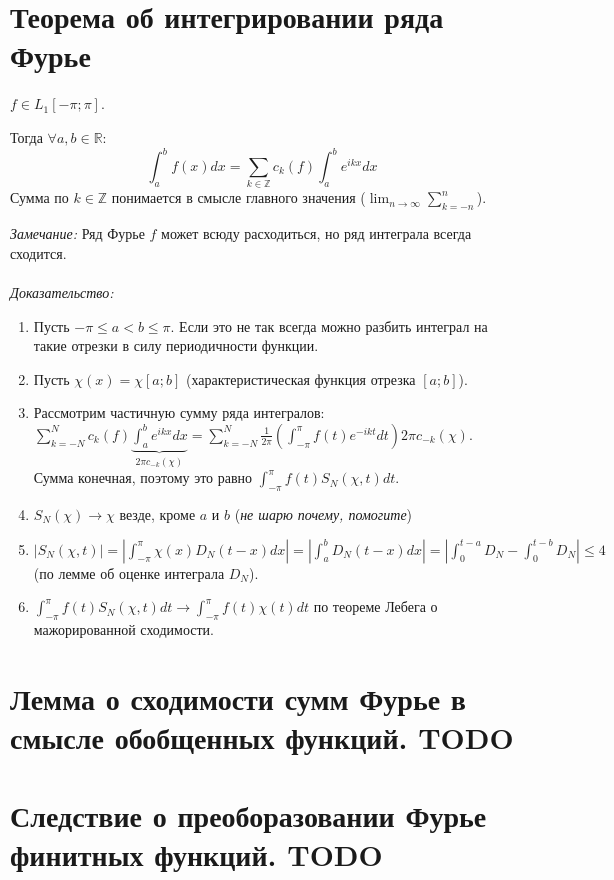 \documentclass[paper=a4, fontsize=17pt]{article}
\begin{document}
\section{Теорема об интегрировании ряда Фурье}
$f \in L_1[-\pi;\pi]$.

Тогда $\forall a, b \in \mathbb{R}$:
$$\int_a^b f(x)dx = \sum_{k\in\mathbb{Z}} c_k(f) \int_a^b e^{ikx} dx$$
Сумма по $k \in \mathbb{Z}$ понимается в смысле главного значения ($\lim_{n \to \infty} \sum_{k=-n}^n$).

\emph{Замечание:} Ряд Фурье $f$ может всюду расходиться, но ряд интеграла всегда сходится.
\\\\
\emph{Доказательство:}

\begin{enumerate}
    \item Пусть $-\pi \leq a < b \leq \pi$. Если это не так всегда можно разбить интеграл на такие отрезки в силу периодичности функции.
    \item Пусть $\chi(x) = \chi[a;b]$ (характеристическая функция отрезка $[a;b]$).
    \item Рассмотрим частичную сумму ряда интегралов:\\
        $\sum_{k=-N}^N c_k(f) \underbrace{\int_a^b e^{ikx} dx}_{2\pi c_{-k}(\chi)} =
        \sum_{k=-N}^N \frac{1}{2\pi} (\int_{-\pi}^\pi f(t) e^{-ikt} dt) 2\pi c_{-k}(\chi)$.\\
        Сумма конечная, поэтому это равно $\int_{-\pi}^{\pi} f(t) S_N(\chi,t) dt$.
    \item $S_N(\chi) \to \chi$ везде, кроме $a$ и $b$ (\emph{не шарю почему, помогите})
    \item $|S_N(\chi,t)| = |\int_{-\pi}^\pi \chi(x)D_N(t-x)dx| = |\int_a^b D_N(t-x)dx| =
        |\int_0^{t-a}D_N - \int_0^{t-b}D_N| \leq 4$ (по лемме об оценке интеграла $D_N$).
    \item $\int_{-\pi}^\pi f(t)S_N(\chi,t) dt \to \int_{-\pi}^\pi f(t) \chi(t) dt$ по теореме Лебега о мажорированной сходимости.
\end{enumerate}

\section{Лемма о сходимости сумм Фурье в смысле обобщенных функций. TODO}
\section{Следствие о преоборазовании Фурье финитных функций. TODO}
\end{document}
